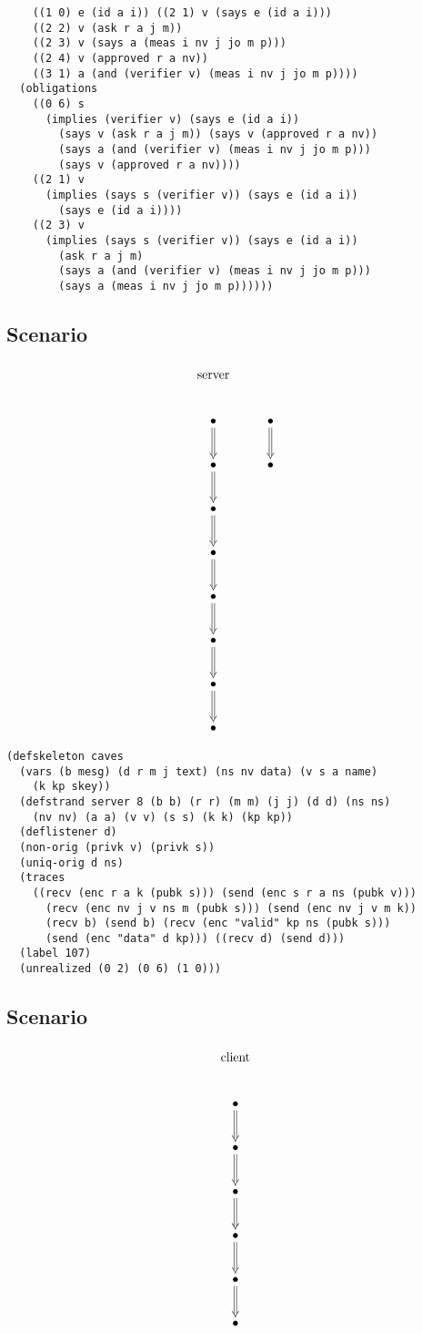 \documentclass[titlepage,12pt]{article}
\theoremstyle{definition}
\begin{document}
\begin{verbatim}
    ((1 0) e (id a i)) ((2 1) v (says e (id a i)))
    ((2 2) v (ask r a j m))
    ((2 3) v (says a (meas i nv j jo m p)))
    ((2 4) v (approved r a nv))
    ((3 1) a (and (verifier v) (meas i nv j jo m p))))
  (obligations
    ((0 6) s
      (implies (verifier v) (says e (id a i))
        (says v (ask r a j m)) (says v (approved r a nv))
        (says a (and (verifier v) (meas i nv j jo m p)))
        (says v (approved r a nv))))
    ((2 1) v
      (implies (says s (verifier v)) (says e (id a i))
        (says e (id a i))))
    ((2 3) v
      (implies (says s (verifier v)) (says e (id a i))
        (ask r a j m)
        (says a (and (verifier v) (meas i nv j jo m p)))
        (says a (meas i nv j jo m p))))))
\end{verbatim}

\subsection{Scenario}

$$\xymatrix{
\txt{\strut server}&\txt{\strut }\\
\bullet\ar@{=>}[d]&\bullet\ar@{=>}[d]\\
\bullet\ar@{=>}[d]&\bullet\\
\bullet\ar@{=>}[d]&\\
\bullet\ar@{=>}[d]&\\
\bullet\ar@{=>}[d]&\\
\bullet\ar@{=>}[d]&\\
\bullet\ar@{=>}[d]&\\
\bullet&}$$

\begin{verbatim}
(defskeleton caves
  (vars (b mesg) (d r m j text) (ns nv data) (v s a name)
    (k kp skey))
  (defstrand server 8 (b b) (r r) (m m) (j j) (d d) (ns ns)
    (nv nv) (a a) (v v) (s s) (k k) (kp kp))
  (deflistener d)
  (non-orig (privk v) (privk s))
  (uniq-orig d ns)
  (traces
    ((recv (enc r a k (pubk s))) (send (enc s r a ns (pubk v)))
      (recv (enc nv j v ns m (pubk s))) (send (enc nv j v m k))
      (recv b) (send b) (recv (enc "valid" kp ns (pubk s)))
      (send (enc "data" d kp))) ((recv d) (send d)))
  (label 107)
  (unrealized (0 2) (0 6) (1 0)))
\end{verbatim}

\subsection{Scenario}

$$\xymatrix{
\txt{\strut client}\\
\bullet\ar@{=>}[d]\\
\bullet\ar@{=>}[d]\\
\bullet\ar@{=>}[d]\\
\bullet\ar@{=>}[d]\\
\bullet\ar@{=>}[d]\\
\bullet}$$
\end{document}
